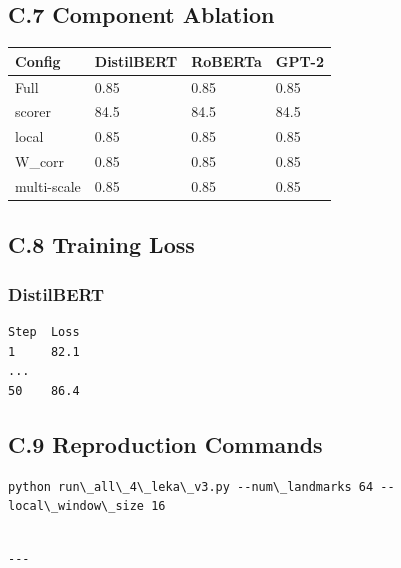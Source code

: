 \subsection{C.7 Component Ablation}

\begin{table}[H]
\centering
\small
\begin{tabular}{llll}
\toprule
\textbf{Config} & \textbf{DistilBERT} & \textbf{RoBERTa} & \textbf{GPT-2} \\
\midrule
Full & 0.85 & 0.85 & 0.85 \\
scorer & 84.5 & 84.5 & 84.5 \\
local & 0.85 & 0.85 & 0.85 \\
W\_corr & 0.85 & 0.85 & 0.85 \\
multi-scale & 0.85 & 0.85 & 0.85 \\
\bottomrule
\end{tabular}
\end{table}

\subsection{C.8 Training Loss}

\subsubsection{DistilBERT}
\begin{lstlisting}
Step  Loss
1     82.1
...
50    86.4
\end{lstlisting}

\subsection{C.9 Reproduction Commands}

\begin{lstlisting}
python run\_all\_4\_leka\_v3.py --num\_landmarks 64 --local\_window\_size 16
\end{lstlisting}
\begin{lstlisting}

---
\end{lstlisting}